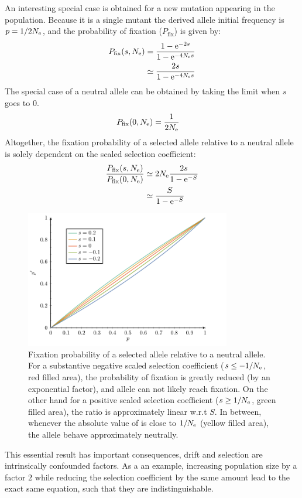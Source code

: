 An interesting special case is obtained for a new mutation appearing in the population.
Because it is a single mutant the derived \gls{allele} initial frequency is $p = 1 / 2 N_{\textrm{e}}$, and the probability of fixation ($P_{\mathrm{fix}}$) is given by:
\begin{align}
	P_{\mathrm{fix}}(s, N_{\textrm{e}}) & = \dfrac{1 - \mathrm{e}^{-2 s}}{1 - \mathrm{e}^{-4 N_{\textrm{e}} s}} \\
	 & \simeq  \dfrac{2 s }{1 - \mathrm{e}^{-4 N_{\textrm{e}} s}}
\end{align}
The special case of a \gls{neutral} \gls{allele} can be obtained by taking the limit when $s$ goes to $0$.
\begin{align}
P_{\mathrm{fix}}(0, N_{\textrm{e}}) & = \dfrac{1}{2 N_{\textrm{e}}}
\end{align}
Altogether, the fixation probability of a selected \gls{allele} relative to a \gls{neutral} \gls{allele} is solely dependent on the scaled selection coefficient:
\begin{align}
\dfrac{P_{\mathrm{fix}}(s, N_{\textrm{e}})}{P_{\mathrm{fix}}(0, N_{\textrm{e}})} & \simeq 2 N_{\textrm{e}} \dfrac{2s}{1 - \mathrm{e}^{-S}} \\
& \simeq  \dfrac{S}{1 - \mathrm{e}^{-S}} \label{eq:p-fix}
\end{align}
\begin{figure}[H]
	\centering
	\includegraphics[width=0.8\textwidth, page=2] {figures.pdf}
	\caption[Relative fixation probability]{Fixation probability of a selected {allele} relative to a {neutral} {allele}.
	For a substantive negative scaled selection coefficient ($s \leq -1/N_{\textrm{e}}$, red filled area), the probability of fixation is greatly reduced (by an exponential factor), and \gls{allele} can not likely reach fixation. On the other hand for a positive scaled selection coefficient ($s \geq 1 / N_{\textrm{e}}$, green filled area), the ratio is approximately linear w.r.t $S$. In between, whenever the absolute value of is close to $1 / N_{\textrm{e}}$ (yellow filled area), the \gls{allele} behave approximately neutrally.}
\end{figure}
This essential result has important consequences, \gls{drift} and selection are intrinsically confounded factors.
As a an example, increasing population size by a factor $2$ while reducing the selection coefficient by the same amount lead to the exact same equation, such that they are indistinguishable.

